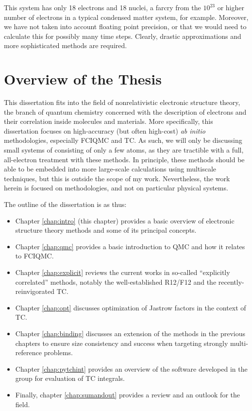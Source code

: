 This system has only 18 electrons and 18 nuclei, a farcry from the $10^{23}$ or higher number of electrons in a typical condensed matter system, for example. Moreover, we have not taken into account floating point precision, or that we would need to calculate this for possibly many time steps. Clearly, drastic approximations and more sophisticated methods are required.

\section{Overview of the Thesis}

This dissertation fits into the field of nonrelativistic electronic structure theory, the branch of quantum chemistry concerned with the description of electrons and their correlation inside molecules and materials. More specifically, this dissertation focuses on high-accuracy (but often high-cost) \emph{ab initio} methodologies, especially \gls{FCIQMC} and \gls{TC}. As such, we will only be discussing small systems of consisting of only a few atoms, as they are tractible with a full, all-electron treatment with these methods. In principle, these methods should be able to be embedded  into more large-scale calculations using multiscale techniques, but this is outside the scope of my work. Nevertheless, the work herein is focused on methodologies, and not on particular physical systems.

The outline of the dissertation is as thus:
\begin{itemize}
    \item Chapter \ref{chap:intro} (this chapter) provides a basic overview of electronic structure theory methods and some of its principal concepts.
    \item Chapter \ref{chap:qmc} provides a basic introduction to \gls{QMC} and how it relates to \gls{FCIQMC}.
    \item Chapter \ref{chap:explicit} reviews the current works in so-called ``explicitly correlated'' methods, notably the well-established R12/F12 and the recently-reinvigorated \gls{TC}.
    \item Chapter \ref{chap:opt} discusses optimization of Jastrow factors in the context of \gls{TC}.
    \item Chapter \ref{chap:binding} discusses an extension of the methods in the previous chapters to ensure size consistency and success when targeting strongly multi-reference problems.
    \item Chapter \ref{chap:pytchint} provides an overview of the software \pytchint developed in the group for evaluation of \gls{TC} integrals.
    \item Finally, chapter \ref{chap:sumandout} provides a review and an outlook for the field.
\end{itemize}


